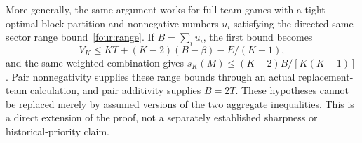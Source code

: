 \begin{remark}\label{four:exchange}
More generally, the same argument works for full-team games with a tight
optimal block partition and nonnegative numbers $u_i$ satisfying the
directed same-sector range bound~\eqref{four:range}. If
$B=\sum_i u_i$, the first bound becomes
\[
       V_K\le KT+(K-2)(B-\beta)-E/(K-1),
\]
and the same weighted combination gives
$s_K(M)\le (K-2)B/[K(K-1)]$.
Pair nonnegativity supplies these range bounds through an actual
replacement-team calculation, and pair additivity supplies $B=2T$.
These hypotheses cannot be replaced merely by assumed versions of the
two aggregate inequalities. This is a direct extension of the proof,
not a separately established sharpness or historical-priority claim.
\end{remark}
